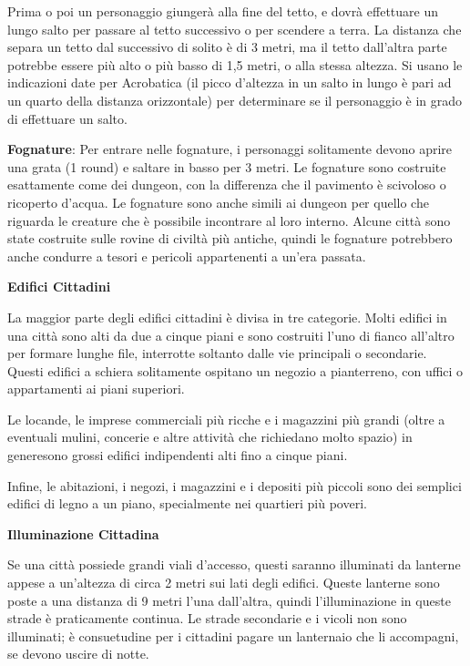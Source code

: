 \documentclass[a4paper,11pt,twoside,openany]{book}
\begin{document}
Prima o poi un personaggio giungerà alla fine del tetto, e dovrà effettuare un lungo salto per passare al tetto successivo o per scendere a terra. La distanza che separa un tetto dal successivo di solito è di 3 metri, ma il tetto dall'altra parte potrebbe essere più alto o più basso di 1,5 metri, o alla stessa altezza. Si usano le indicazioni date per Acrobatica (il picco d'altezza in un salto in lungo è pari ad un quarto della distanza orizzontale) per determinare se il personaggio è in grado di effettuare un salto.

\textbf{Fognature}: Per entrare nelle fognature, i personaggi solitamente devono aprire una grata (1 round) e saltare in basso per 3 metri. Le fognature sono costruite esattamente come dei dungeon, con la differenza che il pavimento è scivoloso o ricoperto d'acqua. Le fognature sono anche simili ai dungeon per quello che riguarda le creature che è possibile incontrare al loro interno. Alcune città sono state costruite sulle rovine di civiltà più antiche, quindi le fognature potrebbero anche condurre a tesori e pericoli appartenenti a un'era passata.

\textbf{Edifici Cittadini}

La maggior parte degli edifici cittadini è divisa in tre categorie. Molti edifici in una città sono alti da due a cinque piani e sono costruiti l'uno di fianco all'altro per formare lunghe file, interrotte soltanto dalle vie principali o secondarie. Questi edifici a schiera solitamente ospitano un negozio a pianterreno, con uffici o appartamenti ai piani superiori.

Le locande, le imprese commerciali più ricche e i magazzini più grandi (oltre a eventuali mulini, concerie e altre attività che richiedano molto spazio) in generesono grossi edifici indipendenti alti fino a cinque piani.

Infine, le abitazioni, i negozi, i magazzini e i depositi più piccoli sono dei semplici edifici di legno a un piano, specialmente nei quartieri più poveri.

\textbf{Illuminazione Cittadina}

Se una città possiede grandi viali d'accesso, questi saranno illuminati da lanterne appese a un'altezza di circa 2 metri sui lati degli edifici. Queste lanterne sono poste a una distanza di 9 metri l'una dall'altra, quindi l'illuminazione in queste strade è praticamente continua. Le strade secondarie e i vicoli non sono illuminati; è consuetudine per i cittadini pagare un lanternaio che li accompagni, se devono uscire di notte.
\end{document}
